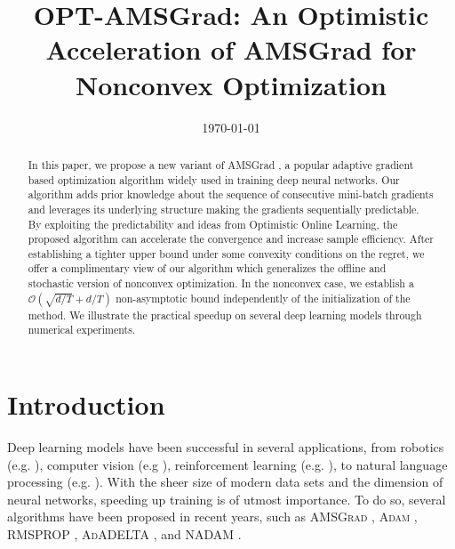 \documentclass[11pt]{article}
\theoremstyle{k}
\begin{document}
\title{OPT-AMSGrad: An Optimistic Acceleration of AMSGrad for Nonconvex Optimization}
\date{\today}

\maketitle


\begin{abstract}
In this paper, we propose a new variant of AMSGrad \citep{RKK18}, a popular adaptive gradient based optimization algorithm widely used in training deep neural networks. 
Our algorithm adds prior knowledge about the sequence of consecutive mini-batch gradients and leverages its underlying structure making the gradients sequentially predictable. 
By exploiting the predictability and ideas from Optimistic Online Learning, the proposed algorithm can accelerate the convergence and increase sample efficiency.
After establishing a tighter upper bound under some convexity conditions on the regret, we offer a complimentary view of our algorithm which generalizes the offline and stochastic version of nonconvex optimization. 
In the nonconvex case, we establish a $\mathcal{O}\left(\sqrt{d/T} +d/T \right)$ non-asymptotic bound independently of the initialization of the method.
We illustrate the practical speedup on several deep learning models through numerical experiments.
\end{abstract}

\section{Introduction}

Deep learning models have been successful in several applications, from robotics (e.g. \citep{LFDA17}), computer vision (e.g \citep{Rnet16,goodfellow2014generative}), reinforcement learning (e.g. \citep{Atari13}), to natural language processing (e.g. \citep{GMH13}).
With the sheer size of modern data sets and the dimension of neural networks, speeding up training is of utmost importance.
To do so, several algorithms have been proposed in recent years, such as  \textsc{AMSGrad} \citep{RKK18}, \textsc{Adam} \citep{KB15}, \textsc{RMSPROP} \citep{TH12}, \textsc{AdADELTA} \citep{Z12}, and \textsc{NADAM} \citep{D16}.
\end{document}
